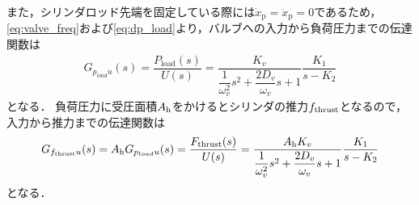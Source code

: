 また，シリンダロッド先端を固定している際には$\dot{x}_\mathrm{p}=\ddot{x}_\mathrm{p}=0$であるため，\eqnname\ref{eq:valve_freq}および\eqnname\ref{eq:dp_load}より，バルブへの入力から負荷圧力までの伝達関数は
\begin{align}
    \label{eq:tf_Gpu}
    G_{p_{load} u} (s)= \dfrac{P_\mathrm{load}(s)}{U(s)} = \dfrac{K_v}{\dfrac{1}{\omega_v^2}s^2 + \dfrac{2D_v}{\omega_v}s + 1}\dfrac{K_1}{s-K_2}
\end{align}
となる．
負荷圧力に受圧面積$A_\mathrm{h}$をかけるとシリンダの推力$f_\mathrm{thrust}$となるので，入力から推力までの伝達関数は
\begin{align}
    \label{eq:tf_Gfthru}
    G_{f_\mathrm{thrust} u} (s)=A_\mathrm{h} G_{p_{load} u} (s)= \dfrac{F_\mathrm{thrust}(s)}{U(s)} =\dfrac{A_\mathrm{h} K_v}{\dfrac{1}{\omega_v^2}s^2 + \dfrac{2D_v}{\omega_v}s + 1}\dfrac{K_1}{s-K_2}
\end{align}
となる．
























